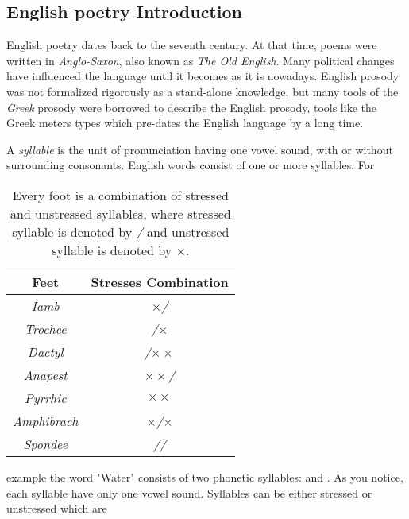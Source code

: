 \documentclass[12pt]{report}
\begin{document}
\subsection{English poetry Introduction}
English poetry dates back to the seventh century. At that time, poems were
written in \textit{Anglo-Saxon}, also known as \textit{The Old English}. Many
political changes have influenced the language until it becomes as it is
nowadays. English prosody was not formalized rigorously as a stand-alone
knowledge, but many tools of the \textit{Greek} prosody were borrowed to describe
the English prosody, tools like the Greek meters types which pre-dates the
English language by a long time.

A \textit{syllable} is the unit of pronunciation having one vowel sound, with or
without surrounding consonants. English words consist of one or more syllables.
For
\begin{table}[!t]
  \centering
  \begin{tabular}{|c | c|} 
    \hline
    \textbf{{Feet}}     & \textbf{{Stresses Combination}}\\ 
    \hline
\textit{Iamb} & $\times$\textit{/}\\             %
\textit{Trochee}& \textit{/}$\times$\\           %
\textit{Dactyl} & \textit{/}$\times\times$\\     %
\textit{Anapest}& $\times\times$\textit{/}\\     %
\textit{Pyrrhic}& $\times\times$\\               %
\textit{Amphibrach}& $\times$\textit{/}$\times$\\%
\textit{Spondee}& \textit{/}\textit{/}\\
    \hline
  \end{tabular}
  \caption{Every foot is a combination of stressed and unstressed syllables,
where stressed syllable is denoted by \textit{/} and unstressed syllable is
denoted by $\times$.}
\label{feet}
\end{table}
example the word "Water"  consists of two phonetic syllables:
and . As you notice, each syllable have only one vowel
sound.
Syllables can be either stressed or unstressed which are
\end{document}
